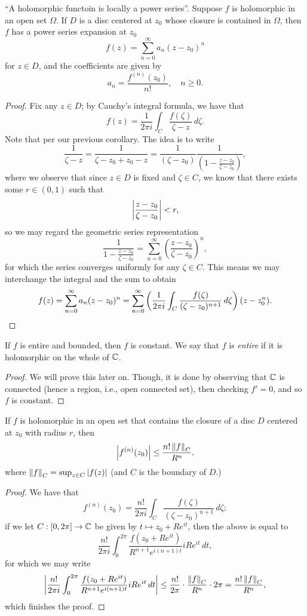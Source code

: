 \begin{theorem}
    ``A holomorphic functoin is locally a power series''. Suppose $f$ is holomorphic in an open set $\Omega$. If $D$ is a disc centered at $z_0$ whose closure is contained in $\Omega$, then $f$ has a power series expansion at $z_0$
    \[ f(z) = \sum_{n = 0}^\infty a_n (z - z_0)^n \]
    for $z \in D$, and the coefficients are given by
    \[ a_n = \frac{f^{(n)}(z_0)}{n!}, \quad n \geq 0. \]
\end{theorem}
\begin{proof}
    Fix any $z \in D$; by Cauchy's integral formula, we have that
    \[ f(z) = \frac{1}{2\pi i} \int_C \frac{f(\zeta)}{\zeta - z} \, d\zeta. \]
    Note that per our previous corollary. The idea is to write
    \[ \frac{1}{\zeta - z} = \frac{1}{\zeta - z_0 + z_0 - z} = \frac{1}{(\zeta - z_0)}\frac{1}{\left(1 - \frac{z - z_0}{\zeta - z_0}\right)}, \]
    where we observe that since $z \in D$ is fixed and $\zeta \in C$, we know that there exists some $r \in (0, 1)$ such that
    \[ \left\lvert \frac{z - z_0}{\zeta - z_0} \right\rvert < r, \]
    so we may regard the geometric series representation
    \[ \frac{1}{1 - \frac{z - z_0}{\zeta - z_0}} = \sum_{n=0}^\infty \left(\frac{z - z_0}{\zeta - z_0}\right)^n, \]
    for which the series converges uniformly for any $\zeta \in C$. This means we may interchange the integral and the sum to obtain
    \[ f(z) = \sum_{n=0}^\infty a_n (z - z_0)^n = \sum_{n=0}^\infty \left(\frac{1}{2 \pi i} \int_C \frac{f(\zeta)}{(\zeta - z_0)^{n+1}} \, d\zeta\right) (z - z_0^n). \qedhere \]
\end{proof}
\begin{corollary}
    If $f$ is entire and bounded, then $f$ is constant. We say that $f$ is \textit{entire} if it is holomorphic on the whole of $\mathbb C$.
\end{corollary}
\begin{proof}
    We will prove this later on. Though, it is done by observing that $\mathbb C$ is connected (hence a region, i.e., open connected set), then checking $f' = 0$, and so $f$ is constant.
\end{proof}
\begin{corollary}
    If $f$ is holomorphic in an open set that contains the closure of a disc $D$ centered at $z_0$ with radius $r$, then
    \[ \left\lvert f^{(n)}(z_0) \right\rvert \leq \frac{n! \left\lVert f \right\rVert_C}{R^n}, \]
    where $\left\lVert f \right\rVert_C = \sup_{z \in C} \left\lvert f(z) \right\rvert$ (and $C$ is the boundary of $D$.)
\end{corollary}
\begin{proof}
    We have that
    \[ f^{(n)}(z_0) = \frac{n!}{2\pi i} \int_C \frac{f(\zeta)}{(\zeta - z_0)^{n+1}} \, d\zeta; \]
    if we let $C : [0, 2\pi] \to \mathbb C$ be given by $t \mapsto z_0 + Re^{it}$, then the above is equal to
    \[ \frac{n!}{2 \pi i} \int_0^{2\pi} \frac{f(z_0 + Re^{it})}{R^{n+1} e^{i(n+1)t}} i Re^{it} \, dt, \]
    for which we may write
    \[ \left\lvert \frac{n!}{2 \pi i} \int_0^{2\pi} \frac{f(z_0 + Re^{it})}{R^{n+1} e^{i(n+1)t}} i Re^{it} \, dt \right\rvert \leq \frac{n!}{2\pi} \cdot \frac{\left\lVert f \right\rVert_C}{R^n} \cdot 2\pi = \frac{n! \left\lVert f \right\rVert_C}{R^n}, \]
    which finishes the proof.
\end{proof}